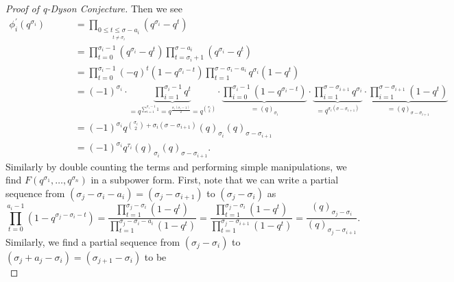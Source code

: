 \begin{proof}[Proof of q-Dyson Conjecture]
	Then we see
	\begin{align*}
		\phi _{i} ^{\prime}\left( q^{\sigma_{i}} \right) &= \prod_{\underset{t \neq \sigma _{i}}{0 \le t \le \sigma - a_{i}}}^{} \left( q^{\sigma_{i}} - q^{t} \right) \\
								 &= \prod_{t=0}^{\sigma_{i} - 1} \left( q^{\sigma_{i}} - q^{t} \right) \prod_{t=\sigma_{i} + 1}^{\sigma - a_{i}} \left( q^{\sigma_{i}} - q^{t} \right)   \\
								 &= \prod_{t=0}^{\sigma_{i} - 1} \left( -q \right)^{t} \left( 1 - q^{\sigma_{i} - t} \right) \prod_{t=1}^{\sigma - \sigma_{i} - a_{i}} q^{\sigma_{i}}\left( 1- q^{t} \right)   \\
	\quad \quad \quad \quad \quad \quad 						 &= \left( -1 \right) ^{\sigma_{i}} \cdot \underbrace{\prod_{i= 1}^{\sigma_{i} - 1} q^{t}}_{=q^{\sum_{i= 1}^{\sigma _{i} - 1} 1} = q^{\frac{\sigma_{i} \left( \sigma_{i} - 1 \right) }{2}} = q^{\binom{\sigma_{i}}{2}}} \cdot \underbrace{\prod_{i=0}^{\sigma_{i} - 1} ( 1 - q^{\sigma_{i} - t})}_{= \left( q \right) _{\sigma_{i}}} \cdot \underbrace{\prod_{i= 1}^{\sigma - \sigma_{i + 1}} q^{\sigma_{i}}}_{=q^{\sigma_{i} \left( \sigma - \sigma_{i + 1}  \right) }} \cdot \underbrace{\prod_{i= 1}^{\sigma - \sigma_{i + 1}} \left( 1 - q^{t} \right)}_{= \left( q \right) _{\sigma - \sigma_{i + 1} }}   \\
								 &= \left( -1 \right) ^{\sigma_{i}} q^{\binom{\sigma_{i}}{2} + \sigma_{i} \left( \sigma - \sigma_{i + 1}  \right) } \left( q \right) _{\sigma_{i}} \left( q \right) _{\sigma - \sigma_{i + 1}} \\
								 &= \left( -1 \right) ^{\sigma_{i}}q^{\tau _{i}}\left( q \right) _{\sigma_{i}}\left( q \right) _{\sigma - \sigma_{i + 1} }
	.\end{align*}
Similarly by double counting the terms and performing simple manipulations, we find \(F\left( q^{\sigma_1}, \ldots, q^{\sigma_{n}} \right) \) in a subpower form. First, note that we can write a partial sequence from \((\sigma_{j} - \sigma_{i} - a_{i}) = (\sigma_{j} - \sigma_{i + 1})\) to \(\left( \sigma_{j} - \sigma_{i} \right) \) as \[\prod_{t= 0}^{a_{i} - 1} \left( 1 - q^{\sigma_{j} - \sigma_{i} - t} \right) = \frac{\prod_{t=1}^{\sigma_{j} - \sigma_{i}} \left( 1 - q^{t} \right) }{\prod_{t = 1 }^{\sigma_{j} - \sigma_{i} - a_{i}} \left( 1 - q^{t} \right) }= \frac{\prod_{t=1}^{\sigma_{j} - \sigma_{i}} \left( 1 - q^{t} \right) }{\prod_{t = 1 }^{\sigma_{j} - \sigma_{i + 1}} \left( 1 - q^{t} \right) } = \frac{\left( q \right) _{\sigma_{j} - \sigma_{i}}}{\left( q \right) _{\sigma_{j} - \sigma_{i + 1}}}.\] Similarly, we find a partial sequence from \((\sigma_{j} - \sigma_{i})\) to \(\left( \sigma_{j} + a_{j} - \sigma_{i} \right) = \left( \sigma_{j + 1} - \sigma_{i} \right)  \) to be \[
\]
\end{proof}
